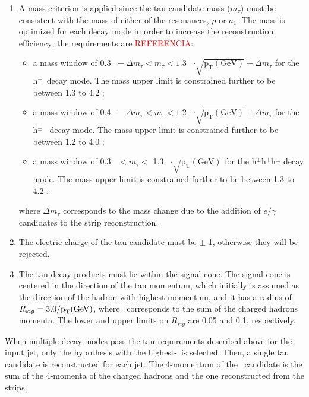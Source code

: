 \begin{enumerate}
 \item A mass criterion is applied since the tau candidate mass ($m_{\tau}$) must be consistent with the 
 mass of either of the resonances, $\rho$ or $a_{1}$. The mass is optimized for each decay mode
in order to increase the reconstruction efficiency; the requirements are \textcolor{red}{REFERENCIA}:
\begin{itemize}
 \item a mass window of 0.3 \GeV~$-~\Delta m_{\tau} < m_{\tau} < 1.3$ \GeV~$\cdot \sqrt{\textrm{p}_{\textrm{T}} (\textrm{GeV})} + \Delta m_{\tau}$ 
 for the h$^{\pm}$\picero~decay mode. The mass upper limit is constrained further to be between 1.3 to 4.2 \GeV;
 \item a mass window of 0.4 \GeV~$-~\Delta m_{\tau} < m_{\tau} < 1.2$ \GeV~$\cdot \sqrt{\textrm{p}_{\textrm{T}} (\textrm{GeV})} + \Delta m_{\tau}$
 for the h$^{\pm}$\picero\picero~ decay mode. The mass upper limit is constrained further to be between 1.2 to 4.0 \GeV;
 \item a mass window of 0.3 \GeV~$ < m_{\tau} <$ 1.3 \GeV~$\cdot \sqrt{\textrm{p}_{\textrm{T}} (\textrm{GeV})}$ 
 for the h$^{\pm}$h$^{\mp}$h$^{\pm}$ decay mode. The mass upper limit is constrained further to be between 1.3 to 4.2 \GeV. 
\end{itemize}
\noindent where $\Delta m_{\tau}$ corresponds to the mass change due to the addition of $e/\gamma$ candidates 
to the strip reconstruction. 
 \item The electric charge of the tau candidate must be $\pm$ 1, otherwise they will be rejected.
 \item The tau decay products must lie within the signal cone. The signal cone is centered in the 
 direction of the tau momentum, which initially is assumed as the direction of the hadron with highest momentum, and it 
 has a radius of $R_{sig}=3.0 / \textrm{p}_{\textrm{T}} (\GeV)$, where 
 \pt~corresponds to the sum of the charged hadrons momenta. The lower and upper limits on $R_{sig}$ are
 0.05 and 0.1, respectively.
\end{enumerate}

\noindent When multiple decay modes pass the tau requirements described above for the input jet, 
only the hypothesis with the highest-\pt~is selected. Then, a single 
tau candidate is reconstructed for each jet. The 4-momentum of the \tauh~candidate
is the sum of the 4-momenta of the charged hadrons and the one 
reconstructed from the strips.\\


